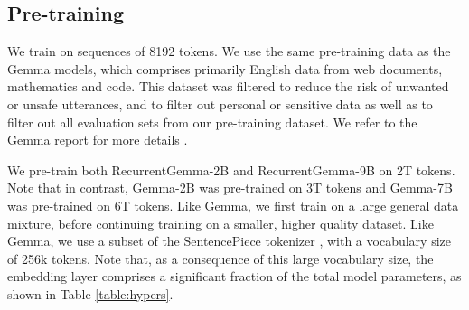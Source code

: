 \documentclass[9pt, a4paper, logo, twocolumn, copyright, nonumbering]{googledeepmind}
\begin{document}
\subsection{Pre-training}

We train on sequences of 8192 tokens. We use the same pre-training data as the Gemma models, which comprises primarily English data from web documents, mathematics and code. This dataset was filtered to reduce the risk of unwanted or unsafe utterances, and to filter out personal or sensitive data as well as to filter out all evaluation sets from our pre-training dataset. We refer to the Gemma report for more details \citep{gemma2024}.


We pre-train both RecurrentGemma-2B and RecurrentGemma-9B on 2T tokens. Note that in contrast, Gemma-2B was pre-trained on 3T tokens and Gemma-7B was pre-trained on 6T tokens. Like Gemma, we first train on a large general data mixture, before continuing training on a smaller, higher quality dataset. Like Gemma, we use a subset of the SentencePiece tokenizer \citep{kudo2018sentencepiece}, with a vocabulary size of 256k tokens. Note that, as a consequence of this large vocabulary size, the embedding layer comprises a significant fraction of the total model parameters, as shown in Table \ref{table:hypers}.
\end{document}
